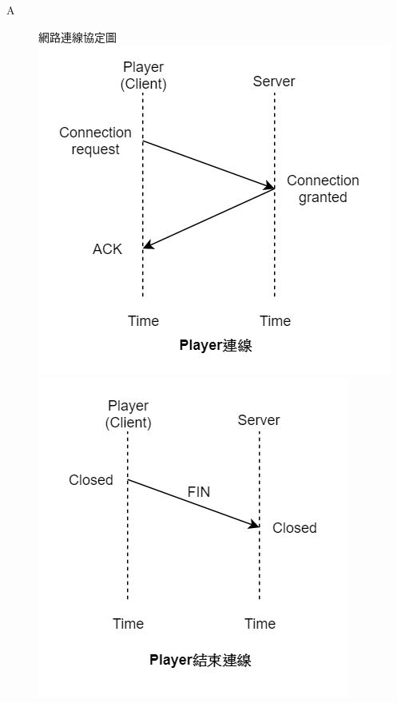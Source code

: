 \documentclass[a0paper,portrait]{baposter}
\begin{document}
\begin{poster}
{\begin{description}
\item[A] 網路連線協定圖
\includegraphics[scale=0.3]{tcp01.JPG}
\includegraphics[scale=0.3]{tcp02.JPG}

\end{description}}
\end{poster}
\end{document}
